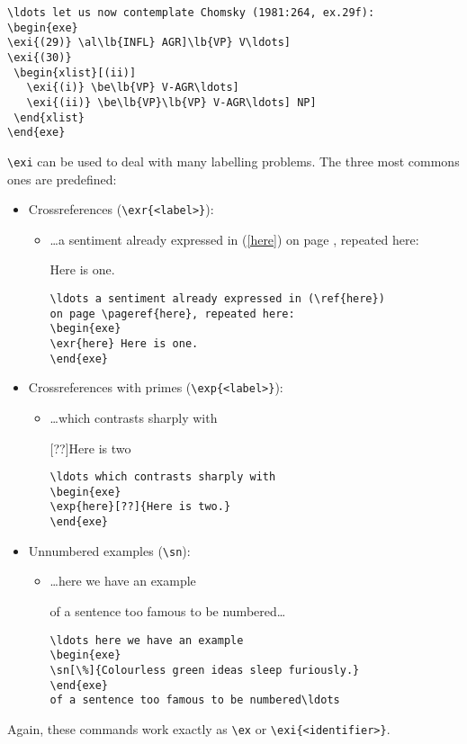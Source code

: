 \documentclass[11pt,a4paper]{article}
\begin{document}
\pagebreak[2]
\begin{verbatim}
\ldots let us now contemplate Chomsky (1981:264, ex.29f):
\begin{exe}
\exi{(29)} \al\lb{INFL} AGR]\lb{VP} V\ldots]
\exi{(30)}
 \begin{xlist}[(ii)]
   \exi{(i)} \be\lb{VP} V-AGR\ldots]
   \exi{(ii)} \be\lb{VP}\lb{VP} V-AGR\ldots] NP]
 \end{xlist}
\end{exe}
\end{verbatim}

\verb'\exi' can be used to deal with many labelling problems. The
three most commons ones are predefined:
\begin{itemize}
\item Crossreferences (\verb'\exr{<label>}'):
  \begin{itemize}
  \item[] 
\ldots a sentiment already expressed in (\ref{here})
on page \pageref{here}, repeated here:
\begin{exe}
 Here is one.
\end{exe}
\begin{verbatim}
\ldots a sentiment already expressed in (\ref{here})
on page \pageref{here}, repeated here:
\begin{exe}
\exr{here} Here is one.
\end{exe}
\end{verbatim}
\end{itemize}
\item Crossreferences with primes (\verb'\exp{<label>}'):
\begin{itemize}\item[]
\ldots which contrasts sharply with
\begin{exe}
[??]{Here is two}
\end{exe}
\begin{verbatim}
\ldots which contrasts sharply with
\begin{exe}
\exp{here}[??]{Here is two.}
\end{exe}
\end{verbatim}
\end{itemize}
\item Unnumbered examples (\verb'\sn'):
\begin{itemize}\item[]
\ldots here we have an example
\begin{exe}
\end{exe}
of a sentence too famous to be numbered\ldots
\begin{verbatim}
\ldots here we have an example
\begin{exe}
\sn[\%]{Colourless green ideas sleep furiously.}
\end{exe}
of a sentence too famous to be numbered\ldots
\end{verbatim}
\end{itemize}
\end{itemize}
Again, these commands work exactly as \verb'\ex' or
\verb'\exi{<identifier>}'. 
\end{document}
